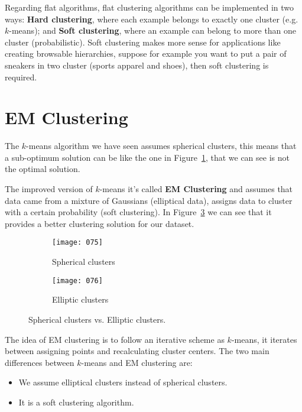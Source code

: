 Regarding flat algorithms, flat clustering algorithms can be implemented in two ways: \textbf{Hard clustering}, where each example belongs to exactly one cluster (e.g. \(k\)-means); and \textbf{Soft clustering}, where an example can belong to more than one cluster (probabilistic). Soft clustering makes more sense for applications like creating browsable hierarchies, suppose for example you want to put a pair of sneakers in two cluster (sports apparel and shoes), then soft clustering is required.

\section{EM Clustering}
The \(k\)-means algorithm we have seen assumes spherical clusters, this means that a sub-optimum solution can be like the one in Figure~\ref{fig:075}, that we can see is not the optimal solution. 

The improved version of \(k\)-means it's called \textbf{EM Clustering} and assumes that data came from a mixture of Gaussians (elliptical data), assigns data to cluster with a certain probability (soft clustering). In Figure~\ref{fig:076} we can see that it provides a better clustering solution for our dataset.

\begin{figure}[t!]
    \centering
    \begin{subfigure}{.4\textwidth}
        \centering
        \label{fig:075}
        \texttt{[image: 075]}
        \caption{Spherical clusters}
    \end{subfigure}
    \begin{subfigure}{.4\textwidth}
        \centering
        \label{fig:076}
        \texttt{[image: 076]}
        \caption{Elliptic clusters}
    \end{subfigure}
    \caption{Spherical clusters vs. Elliptic clusters.}
\end{figure}

The idea of EM clustering is to follow an iterative scheme as \(k\)-means, it iterates between assigning points and recalculating cluster centers. The two main differences between \(k\)-means and EM clustering are:
\begin{itemize}[topsep={0pt}, partopsep={0pt}]
    \itemsep0pt
    \item We assume elliptical clusters instead of spherical clusters.
    \item It is a soft clustering algorithm.
\end{itemize}

